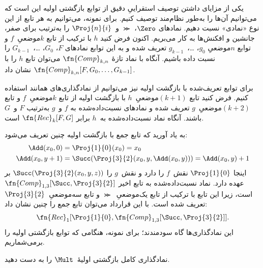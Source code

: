 \documentclass[../../../include/open-logic-section]{subfiles}
\begin{document}

یکی از مزایای داشتن توصیف استقراییِ دقیق از توابع بازگشتی اولیه این
است که می‌توانیم آن‌ها را به‌طور نظام‌مند توصیف کنیم. برای نمونه،
می‌توانیم به هر تابع از این نوع «نمادی» نسبت دهیم. نمادهای $\Zero$،
$\Succ$ و~$\Proj{n}{i}$ را به‌ترتیب برای صفر، جانشین و افکنش‌ها به
کار می‌بریم. اکنون فرض کنید $h$ با ترکیب از تابع $k$موضعیِ~$f$ و
توابع $n$موضعیِ $g_0$، \dots،~$g_{k-1}$ تعریف شده و به این توابع
نمادهای $F$، $G_0$، \dots،~$G_{k-1}$ را نسبت داده باشیم. آنگاه با
نماد تازهٔ $\fn{Comp}_{k,n}$ می‌توان تابع $h$ را با
$\fn{Comp}_{k,n}[F,G_0,\dots,G_{k-1}]$ نشان داد.

برای توابع تعریف‌شده با بازگشت اولیه نیز می‌توانیم از نمادگذاری‌های
همانند استفاده کنیم. فرض کنید تابع $(k+1)$موضعیِ~$h$ با بازگشت اولیه
از تابع $k$موضعیِ~$f$ و تابع $(k+2)$موضعیِ~$g$ تعریف شده و نمادهای
نسبت‌داده‌شده به $f$ و~$g$ به‌ترتیب $F$ و~$G$ باشند. آنگاه نماد
نسبت‌داده‌شده به~$h$ برابر $\fn{Rec}_k[F,G]$ است.

به یاد آورید که تابع جمع با بازگشت اولیه چنین تعریف می‌شود:
\begin{align*}
  \Add(x_0, 0) & = \Proj{1}{0}(x_0) = x_0\\
  \Add(x_0, y+1) & = \Succ(\Proj{3}{2}(x_0, y, \Add(x_0, y))) = \Add(x_0, y) +1
\end{align*}
اینجا $\Proj{1}{0}$ نقش~$f$ را دارد و نقش~$g$ را
$\Succ(\Proj{3}{2}(x_0,y,z))$ بر عهده دارد. نماد نسبت‌داده‌شده به
تابع اخیر $\fn{Comp}_{1,3}[\Succ,\Proj{3}{2}]$ است، زیرا این تابع با
ترکیب از تابع یک‌موضعیِ~$\Succ$ و تابع سه‌موضعیِ~$\Proj{3}{2}$ تعریف
شده است. با این قرارداد می‌توان تابع جمع را چنین نشان داد:
\[
\fn{Rec}_1[\Proj{1}{0},\fn{Comp}_{1,3}[\Succ,\Proj{3}{2}]].
\]
این نمادگذاری‌ها گاه سودمندند؛ برای نمونه، هنگامی که توابع بازگشتی
اولیه را برمی‌شماریم.

\begin{prob}
  نمادگذاری کامل بازگشتی اولیهٔ~$\Mult$ را به دست دهید.
\end{prob}
\end{document}
